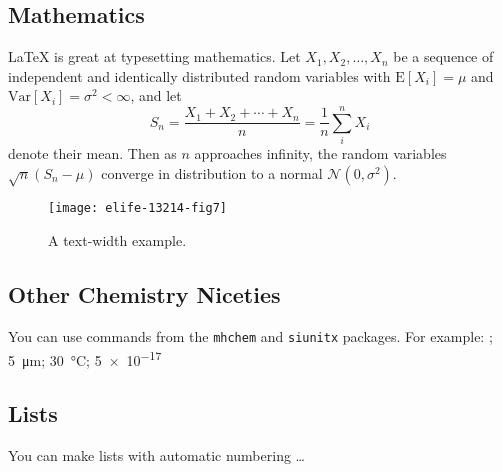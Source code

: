 \subsection{Mathematics}

\LaTeX{} is great at typesetting mathematics. Let $X_1, X_2, \ldots, X_n$ be a sequence of independent and identically distributed random variables with $\text{E}[X_i] = \mu$ and $\text{Var}[X_i] = \sigma^2 < \infty$, and let
\begin{equation}
\label{eq:CLT}
S_n = \frac{X_1 + X_2 + \cdots + X_n}{n}
      = \frac{1}{n}\sum_{i}^{n} X_i
\end{equation}
denote their mean. Then as $n$ approaches infinity, the random variables $\sqrt{n}(S_n - \mu)$ converge in distribution to a normal $\mathcal{N}(0, \sigma^2)$.

\lipsum[3] 

\begin{figure}
\texttt{[image: elife-13214-fig7]}
\caption{A text-width example.}
\label{fig:view}
\label{figsupp:sf1}
\label{videosupp:sv1}
\label{figdata:first}
\label{figdata:second}
\end{figure}

\subsection{Other Chemistry Niceties}

You can use commands from the \texttt{mhchem} and \texttt{siunitx} packages. For example: ; \SI{5}{\micro\metre}; \SI{30}{\degreeCelsius}; \SI{5e-17}{\Molar}

\subsection{Lists}

You can make lists with automatic numbering \dots

